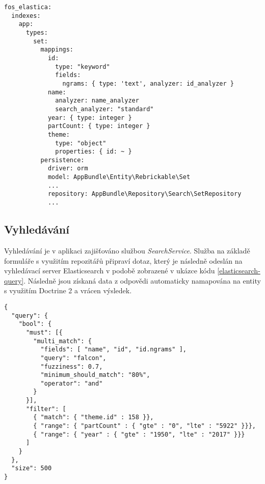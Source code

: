 \begin{listing}[htbp]
  \begin{verbatim}
fos_elastica:
  indexes:
    app:
      types:
        set:
          mappings:
            id:
              type: "keyword"
              fields:
                ngrams: { type: 'text', analyzer: id_analyzer }
            name: 
              analyzer: name_analyzer 
              search_analyzer: "standard"
            year: { type: integer }
            partCount: { type: integer }
            theme:
              type: "object"
              properties: { id: ~ }
          persistence:
            driver: orm
            model: AppBundle\Entity\Rebrickable\Set
            ...
            repository: AppBundle\Repository\Search\SetRepository
            ...
  \end{verbatim}
  \caption{Ukázka nastavení mapování entity \label{elasticsearch-set-index}}
\end{listing}

\subsection{Vyhledávání}
Vyhledávání je v aplikaci zajišťováno službou \textit{SearchService}. Služba na základě formuláře s využitím repozitářů připraví dotaz, který je následně odeslán na vyhledávací server Elasticsearch v podobě zobrazené v ukázce kódu \ref{elasticsearch-query}. Následně jsou získaná data z odpovědi automaticky namapována na entity s využitím Doctrine 2 a vrácen výsledek.

\begin{listing}[htbp]
  \begin{verbatim}
{
  "query": {
    "bool": { 
      "must": [{
        "multi_match": {
          "fields": [ "name", "id", "id.ngrams" ],
          "query": "falcon", 
          "fuzziness": 0.7,
          "minimum_should_match": "80%",
          "operator": "and"
        }
      }],
      "filter": [
        { "match": { "theme.id" : 158 }},
        { "range": { "partCount" : { "gte" : "0", "lte" : "5922" }}},
        { "range": { "year" : { "gte" : "1950", "lte" : "2017" }}}
      ]
    }
  },
  "size": 500
}
        \end{verbatim}
  \caption{Ukázka JSON dotazu Elasticsearch\label{elasticsearch-query}}
\end{listing}

